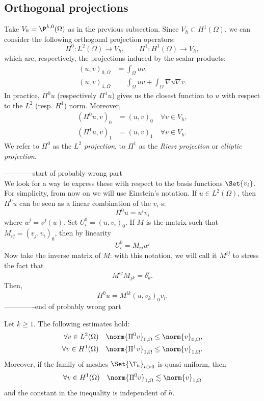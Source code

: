 \subsection{Orthogonal projections}

Take $V_h = \P^{k,0}(\Omega)$ as in the previous subsection. Since $V_h \subset H^1(\Omega)$, we can consider the following orthogonal projection operators:
\[
    \Pi^0: L^2(\Omega) \to V_h, \qquad
    \Pi^1: H^1(\Omega) \to V_h,
\]
which are, respectively, the projections induced by the scalar products:
\begin{align}
    (u,v)_{0,\Omega} &= \int_\Omega uv, \\
    (u,v)_{1,\Omega} &= \int_\Omega uv + \int_\Omega \nabla u \nabla v.
\end{align}
In practice, $\Pi^0 u$ (respectively $\Pi^1 u$) gives us the closest function to $u$ with respect to the $L^2$ (resp. $H^1$) norm. Moreover,
\begin{align}
    (\Pi^0 u, v)_0 &= (u, v)_0 \quad \forall v \in V_h, \\
    (\Pi^1 u, v)_1 &= (u, v)_1 \quad \forall v \in V_h.
\end{align}
We refer to $\Pi^0$ as the \emph{$L^2$ projection}, to $\Pi^1$ as the \emph{Riesz projection} or \emph{elliptic projection}.

------------start of probably wrong part\\
We look for a way to express these with respect to the basis functions $\Set{v_i}$. For simplicity, from now on we will use Einstein's notation. If $u \in L^2(\Omega)$, then $\Pi^0 u$ can be seen as a linear combination of the $v_i$-s:
\[
\Pi^0 u = u^i v_i
\]
where $u^j = v^j(u)$.
Set $U^0_i = (u,v_i)_0$. If $M$ is the matrix such that $M_{ij} = (v_j, v_i)_0$, then by linearity
\[
U^0_i = M_{ij} u^j
\]
Now take the inverse matrix of $M$: with this notation, we will call it $M^{ij}$ to stress the fact that
\[
M^{ij} M_{jk} = \delta^i_k.
\]
Then,
\[
\Pi^0 u = M^{ik} (u,v_k)_0 v_i.
\]
-------------end of probably wrong part

\begin{lemma}
    Let $k\ge1$. The following estimates hold:
    \begin{align}
        \forall v \in L^2(\Omega) \quad \norm{\Pi^0 v}_{0,\Omega} &\le \norm{v}_{0,\Omega}, \\
        \forall v \in H^1(\Omega) \quad \norm{\Pi^1 v}_{1,\Omega} &\le \norm{v}_{1,\Omega}.
    \end{align}
    Moreover, if the family of meshes $\Set{\T_h}_{h>0}$ is quasi-uniform, then
    \[
        \forall v \in H^1(\Omega) \quad \norm{\Pi^0 v}_{1,\Omega} \lesssim \norm{v}_{1,\Omega}
    \]
    and the constant in the inequality is independent of $h$.
\end{lemma}

